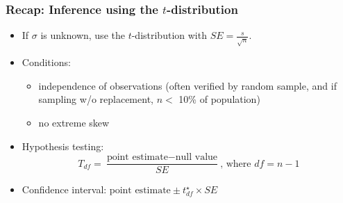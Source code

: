
\begin{frame}
\frametitle{Recap: Inference using the $t$-distribution}

\begin{itemize}

\item If $\sigma$ is unknown, use the $t$-distribution with $SE = \frac{s}{\sqrt{n}}$.

\pause

\item Conditions: 
\begin{itemize}
\item independence of observations (often verified by random sample, and if sampling w/o replacement, $n < $ 10\% of population)
\item no extreme skew
\end{itemize}

\pause

\item Hypothesis testing: 
\[ T_{df} = \frac{\text{point estimate} - \text{null value}}{SE}\text{, where }df = n - 1 \]

\pause

\item Confidence interval: $\text{point estimate} \pm t_{df}^\star \times SE$

\end{itemize}

\pause

\vspace{-0.25cm}


\end{frame}

